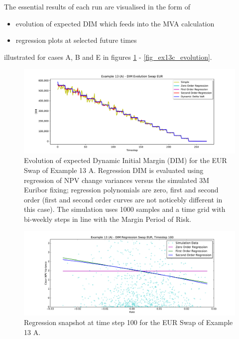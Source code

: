The essential results of each run are visualised in the form of 
\begin{itemize}
\item evolution of expected DIM which feeds into the MVA calculation
\item regression plots at selected future times 
\end{itemize}
illustrated for cases A, B and E in figures \ref{fig_ex13a_evolution} - \ref{fig_ex13c_evolution}. 

\begin{figure}[h!]
\begin{center}
\includegraphics[scale=0.45]{examples/mpl_dim_evolution_A_swap_eur.pdf}
\end{center}
\caption{Evolution of expected Dynamic Initial Margin (DIM) for the EUR Swap of Example 13 A. Regression DIM is evaluated using
  regression of NPV change variances versus the simulated 3M Euribor fixing; regression polynomials are zero, first and
  second order (first and second order curves are not noticebly different in this case). The simulation uses 1000 samples and a time
  grid with bi-weekly steps in line with the Margin Period of Risk.}
\label{fig_ex13a_evolution}
\end{figure}

\begin{figure}[h!]
\begin{center}
\includegraphics[scale=0.45]{examples/mpl_dim_regression_A_swap_eur.pdf}
\end{center}
\caption{Regression snapshot at time step 100 for the EUR Swap of Example 13 A.}
\label{fig_ex13a_regression}
\end{figure}

